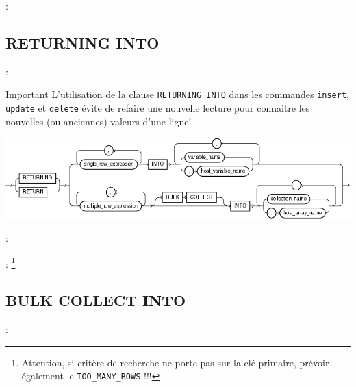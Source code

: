 \documentclass[10pt]{beamer}
\begin{document}
\begin{frame}{\secname : \subsecname}
    
\end{frame}

\subsection{RETURNING INTO}
\begin{frame}{\secname : \subsecname}
    \begin{alertblock}{Important}
        L'utilisation de la clause \lstinline[language=plsql]!RETURNING INTO! dans les commandes \lstinline[language=plsql]!insert!, \lstinline[language=plsql]!update! et \lstinline[language=plsql]!delete! évite de refaire une nouvelle lecture pour connaitre les nouvelles (ou anciennes) valeurs d'une ligne!
    \end{alertblock}
    \centerline{\includegraphics[width=\textwidth]{../assets/img/returning_clause.jpg}}
\end{frame}


\begin{frame}{\secname : \subsecname}
    
\end{frame}


\begin{frame}{\secname : \subsecname}
    \footnote{Attention, si critère de recherche ne porte pas sur la clé primaire, prévoir également le \lstinline[language=plsql]!TOO_MANY_ROWS! !!!}
\end{frame}

\subsection{BULK COLLECT INTO}
\begin{frame}{\secname : \subsecname}
    
\end{frame}
\end{document}
